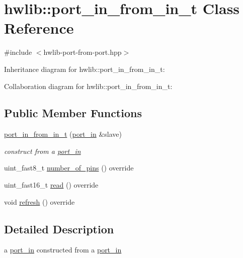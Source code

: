 \hypertarget{classhwlib_1_1port__in__from__in__t}{}\section{hwlib\+:\+:port\+\_\+in\+\_\+from\+\_\+in\+\_\+t Class Reference}
\label{classhwlib_1_1port__in__from__in__t}


{\ttfamily \#include $<$hwlib-\/port-\/from-\/port.\+hpp$>$}



Inheritance diagram for hwlib\+:\+:port\+\_\+in\+\_\+from\+\_\+in\+\_\+t\+:


Collaboration diagram for hwlib\+:\+:port\+\_\+in\+\_\+from\+\_\+in\+\_\+t\+:
\subsection*{Public Member Functions}
\begin{DoxyCompactItemize}
\item 
\mbox{\label{classhwlib_1_1port__in__from__in__t_a3fcc52b175618a8ec299125d01ba23fc}} 
\hyperlink{classhwlib_1_1port__in__from__in__t_a3fcc52b175618a8ec299125d01ba23fc}{port\+\_\+in\+\_\+from\+\_\+in\+\_\+t} (\hyperlink{classhwlib_1_1port__in}{port\+\_\+in} \&slave)
\begin{DoxyCompactList}\small\item\em construct from a \hyperlink{classhwlib_1_1port__in}{port\+\_\+in} \end{DoxyCompactList}\item 
uint\+\_\+fast8\+\_\+t \hyperlink{classhwlib_1_1port__in__from__in__t_a7a0d1cc244540a8183118c778d92deb2}{number\+\_\+of\+\_\+pins} () override
\item 
uint\+\_\+fast16\+\_\+t \hyperlink{classhwlib_1_1port__in__from__in__t_a1c95b00a18f0df57064490c18e2dd96b}{read} () override
\item 
void \hyperlink{classhwlib_1_1port__in__from__in__t_a44f91dea24d3a938b28a35c05249fcd9}{refresh} () override
\end{DoxyCompactItemize}


\subsection{Detailed Description}
a \hyperlink{classhwlib_1_1port__in}{port\+\_\+in} constructed from a \hyperlink{classhwlib_1_1port__in}{port\+\_\+in}

